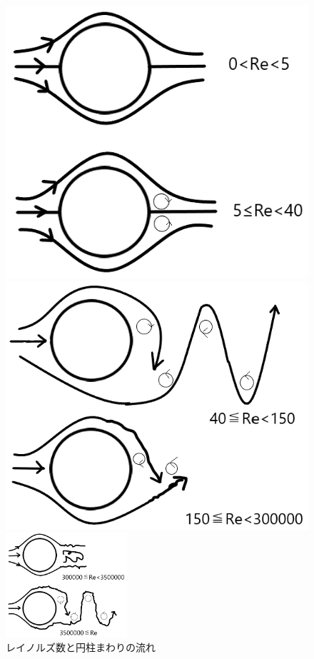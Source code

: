 \documentclass[10pt,b5paper,papersize,dvipdfmx]{jsbook}
\begin{document}
\begin{figure}[ht]
  \centering
  \begin{minipage}{0.4\textwidth}
    \includegraphics[width=\textwidth]{img/ryuutai10.png}
  \end{minipage}
  \qquad %
  \begin{minipage}{0.4\textwidth}
    \includegraphics[width=\textwidth]{img/ryuutai11.png}
  \end{minipage}
  \includegraphics[width=0.4\textwidth]{img/ryuutai12.png}
  \caption{レイノルズ数と円柱まわりの流れ}
\end{figure}
\end{document}
